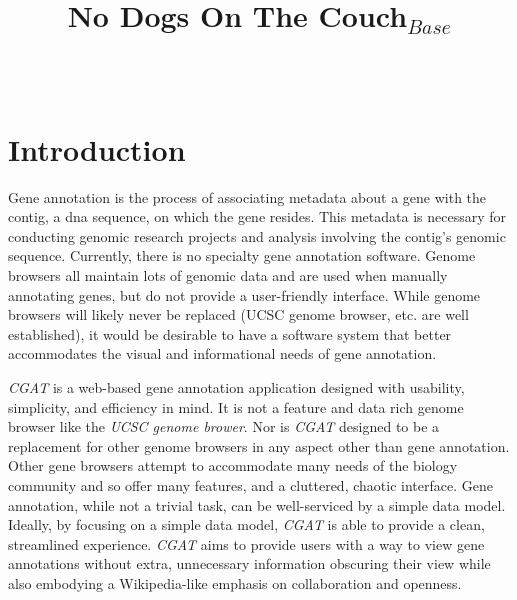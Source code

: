 \documentclass[10pt, conference, compsocconf]{IEEEtran}
\begin{document}
\title{No Dogs On The Couch$_{Base}$}


\author{
\\
}

\maketitle

\thispagestyle{empty}
\pagestyle{empty}

\section{Introduction}\label{sec:introduction}
Gene annotation is the process of associating metadata about a gene with the
contig, a dna sequence, on which the gene resides. This metadata is necessary for conducting
genomic research projects and analysis involving the contig's genomic sequence.
Currently, there is no specialty gene annotation software. Genome browsers
all maintain lots of genomic data and are used when manually annotating genes,
but do not provide a user-friendly interface. While genome browsers
will likely never be replaced (UCSC genome browser, etc. are well
established), it would be desirable to have a software system that better
accommodates the visual and informational needs of gene annotation.

\textit{CGAT} is a web-based gene annotation application designed with
usability, simplicity, and efficiency in mind. It is not a feature and data
rich genome browser like the \textit{UCSC genome brower}. Nor is \textit{CGAT}
designed to be a replacement for other genome browsers in any aspect other than
gene annotation. Other gene browsers attempt to accommodate many needs of the
biology community and so offer many features, and a cluttered, chaotic
interface. Gene annotation, while not a trivial task, can be well-serviced by a
simple data model. Ideally, by focusing on a simple data model, \textit{CGAT}
is able to provide a clean, streamlined experience. \textit{CGAT} aims to
provide users with a way to view gene annotations without extra, unnecessary
information obscuring their view while also embodying a Wikipedia-like emphasis
on collaboration and openness.
\end{document}
